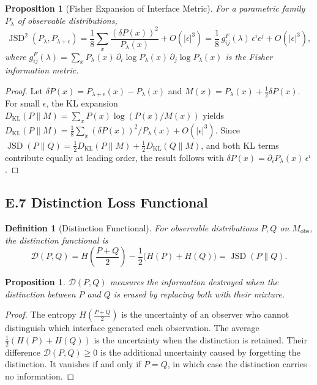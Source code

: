 \documentclass[12pt,a4paper]{article}
\newtheorem{proposition}[theorem]{Proposition}
\newtheorem{definition}[theorem]{Definition}
\theoremstyle{remark}
\begin{document}
\begin{proposition}[Fisher Expansion of Interface Metric]
For a parametric family $P_\lambda$ of observable distributions,
\begin{equation}
  \operatorname{JSD}^2(P_\lambda, P_{\lambda + \epsilon})
  = \frac{1}{8} \sum_x \frac{(\delta P(x))^2}{P_\lambda(x)} + O(|\epsilon|^3)
  = \frac{1}{8}\, g^F_{ij}(\lambda)\,\epsilon^i \epsilon^j + O(|\epsilon|^3),
\end{equation}
where $g^F_{ij}(\lambda) = \sum_x P_\lambda(x)\,\partial_i \log P_\lambda(x)\,
\partial_j \log P_\lambda(x)$ is the Fisher information metric.
\end{proposition}

\begin{proof}
Let $\delta P(x) = P_{\lambda+\epsilon}(x) - P_\lambda(x)$ and
$M(x) = P_\lambda(x) + \frac{1}{2}\delta P(x)$. For small $\epsilon$,
the KL expansion $D_{\mathrm{KL}}(P \| M) = \sum_x P(x)\log(P(x)/M(x))$
yields $D_{\mathrm{KL}}(P \| M) = \frac{1}{8}\sum_x (\delta P(x))^2/P_\lambda(x)
+ O(|\epsilon|^3)$. Since $\operatorname{JSD}(P\|Q) = \frac{1}{2}D_{\mathrm{KL}}(P\|M)
+ \frac{1}{2}D_{\mathrm{KL}}(Q\|M)$, and both KL terms contribute equally
at leading order, the result follows with $\delta P(x) = \partial_i P_\lambda(x)\,\epsilon^i$.
\end{proof}

\subsection*{E.7 Distinction Loss Functional}

\begin{definition}[Distinction Functional]
For observable distributions $P, Q$ on $M_{\mathrm{obs}}$, the
\emph{distinction functional} is
\begin{equation}
  \mathcal{D}(P, Q)
  = H\!\left(\frac{P+Q}{2}\right) - \frac{1}{2}\bigl(H(P) + H(Q)\bigr)
  = \operatorname{JSD}(P \| Q).
\end{equation}
\end{definition}

\begin{proposition}
$\mathcal{D}(P,Q)$ measures the information destroyed when the distinction
between $P$ and $Q$ is erased by replacing both with their mixture.
\end{proposition}

\begin{proof}
The entropy $H(\frac{P+Q}{2})$ is the uncertainty of an observer who
cannot distinguish which interface generated each observation. The average
$\frac{1}{2}(H(P) + H(Q))$ is the uncertainty when the distinction is
retained. Their difference $\mathcal{D}(P,Q) \geq 0$ is the additional
uncertainty caused by forgetting the distinction. It vanishes if and only
if $P = Q$, in which case the distinction carries no information.
\end{proof}
\end{document}
